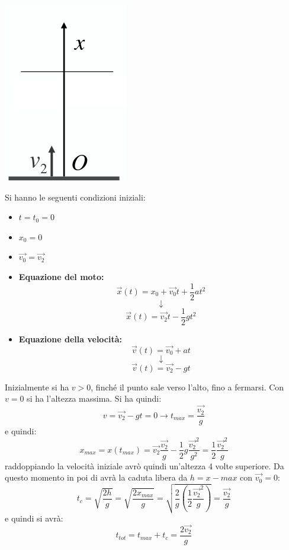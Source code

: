 \documentclass[a4paper,12pt, oneside]{book}
\begin{document}
\begin{center}
\includegraphics[scale=0.4]{img/vert3.png}
\end{center}
Si hanno le seguenti condizioni iniziali:
\begin{itemize}
\item $t=t_0=0$
\item $x_0=0$
\item $\vec{v_0}=\vec{v_2}$
\end{itemize}
\begin{itemize}
\item \textbf{Equazione del moto:}
$$\vec{x}(t)=x_0+\vec{v_0} t+\frac{1}{2} a  t^2$$
$$\downarrow$$
$$\vec{x}(t)=\vec{v_2}t-\frac{1}{2} g t^2$$
\item \textbf{Equazione della velocità:}
$$\vec{v}(t)=\vec{v_0}+a t$$
$$\downarrow$$
$$\vec{v}(t)=\vec{v_2}-gt$$
\end{itemize}
Inizialmente si ha $v>0$, finché il punto sale verso l'alto, fino a fermarsi. Con $v=0$ si ha l'altezza massima. Si ha quindi:
$$v=\vec{v_2}-gt=0\rightarrow t_{max}=\frac{\vec{v_2}}{g}$$
e quindi:
$$x_{max}=x(t_{max})=\vec{v_2}\frac{\vec{v_2}}{g}-\frac{1}{2}g\frac{\vec{v_2}^2}{g^2}=\frac{1}{2}\frac{\vec{v_2}^2}{g}$$
raddoppiando la velocità iniziale avrò quindi un'altezza 4 volte superiore. Da questo momento in poi di avrà la caduta libera da $h=x-max$ con $\vec{v_0}=0$:
$$t_c=\sqrt{\frac{2h}{g}}=\sqrt{\frac{2x_{max}}{g}}=\sqrt{\frac{2}{g}\left(\frac{1}{2}\frac{\vec{v_2}^2}{g}\right)}=\frac{\vec{v_2}}{g}$$
e quindi si avrà:
$$t_{tot}=t_{max}+t_c=\frac{2\vec{v_2}}{g}$$
\end{document}
